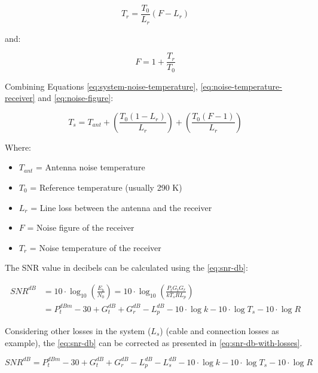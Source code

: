 \begin{equation} \label{eq:noise-temperature-receiver}
    T_{r} = \frac{T_{0}}{L_{r}} (F - L_{r})
\end{equation}

and:

\begin{equation} \label{eq:noise-figure}
    F = 1 + \frac{T_{r}}{T_{0}}
\end{equation}

Combining Equations \ref{eq:system-noise-temperature}, \ref{eq:noise-temperature-receiver} and \ref{eq:noise-figure}:

\begin{equation} \label{eq:system-noise-temp-expanded}
    T_{s} = T_{ant} + \left( \frac{T_{0}(1 - L_{r})}{L_{r}} \right) + \left( \frac{T_{0} (F - 1)}{L_{r}} \right)
\end{equation}

Where:

\begin{itemize}
    \item $T_{ant}$ = Antenna noise temperature
    \item $T_{0}$ = Reference temperature (usually 290 K)
    \item $L_{r}$ = Line loss between the antenna and the receiver
    \item $F$ = Noise figure of the receiver
    \item $T_{r}$ = Noise temperature of the receiver
\end{itemize}

The SNR value in decibels can be calculated using the \autoref{eq:snr-db}:

\begin{equation} \label{eq:snr-db}
    \begin{split}
        SNR^{dB} & = 10 \cdot \log_{10}\left( \frac{E_{b}}{N_{0}} \right) = 10 \cdot \log_{10} \left( \frac{P_{t}G_{t}G_{r}}{kT_{s}RL_{p}} \right) \\
                 & = P_{t}^{dBm} - 30 + G_{t}^{dB} + G_{r}^{dB} - L_{p}^{dB} - 10 \cdot \log k - 10 \cdot \log T_{s} - 10 \cdot \log R
    \end{split}
\end{equation}

Considering other losses in the system ($L_{s}$) (cable and connection losses as example), the \autoref{eq:snr-db} can be corrected as presented in \autoref{eq:snr-db-with-losses}.

\begin{equation} \label{eq:snr-db-with-losses}
    SNR^{dB} = P_{t}^{dBm} - 30 + G_{t}^{dB} + G_{r}^{dB} - L_{p}^{dB} - L_{s}^{dB} - 10 \cdot \log k - 10 \cdot \log T_{s} - 10 \cdot \log R
\end{equation}

